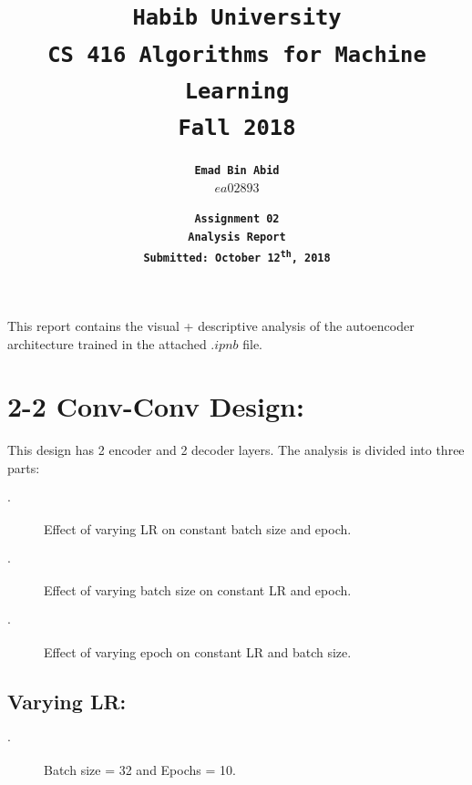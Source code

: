 \documentclass{exam}
\title{\textbf{\tt Habib University}\\ \textbf{\tt CS 416 Algorithms for Machine Learning}\\ \textbf{\tt Fall 2018}}
\author{\textbf{\tt Emad Bin Abid}\\ {\tt $ea02893$}}
\date{\textbf{\tt Assignment 02}\\ \textbf{\tt Analysis Report} \\\textbf{\tt Submitted: October 12\textsuperscript{th}, 2018}}
\begin{document}
\maketitle

This report contains the visual + descriptive  analysis of the autoencoder architecture trained in the attached $.ipnb$ file.

\section{2-2 Conv-Conv Design:}
	This design has 2 encoder and 2 decoder layers. The analysis is divided into three parts:

	\begin{description}
		\item[$\cdot$] Effect of varying LR on constant batch size and epoch.
		\item[$\cdot$] Effect of varying batch size on constant LR and epoch.
		\item[$\cdot$] Effect of varying epoch on constant LR and batch size.
	\end{description}
\pagebreak

	\subsection{Varying LR:}
		\begin{description}
			\item[$\cdot$] Batch size = 32 and Epochs = 10.		
		\end{description}			
\end{document}
